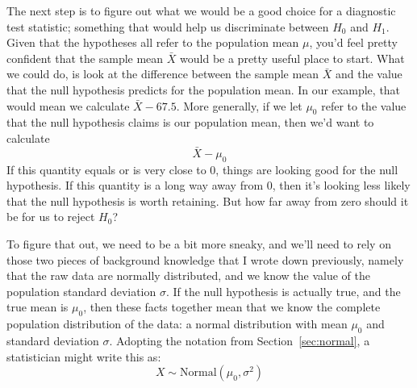 The next step is to figure out what we would be a good choice for a diagnostic test statistic; something that would help us discriminate between $H_0$ and $H_1$. Given that the hypotheses all refer to the population mean $\mu$, you'd feel pretty confident that the sample mean $\bar{X}$ would be a pretty useful place to start. What we could do, is look at the difference between the sample mean $\bar{X}$ and the value that the null hypothesis predicts for the population mean. In our example, that would mean we calculate $\bar{X} - 67.5$. More generally, if we let $\mu_0$ refer to the value that the null hypothesis claims is our population mean, then we'd want to calculate
$$
\bar{X} - \mu_0
$$
If this quantity equals or is very close to 0, things are looking good for the null hypothesis. If this quantity is a long way away from 0, then it's looking less likely that the null hypothesis is worth retaining. But how far away from zero should it be for us to reject $H_0$? 

To figure that out, we need to be a bit more sneaky, and we'll need to rely on those two pieces of background knowledge that I wrote down previously, namely that the raw data are normally distributed, and we know the value of the population standard deviation $\sigma$. If the null hypothesis is actually true, and the true mean is $\mu_0$, then these facts together mean that we know the complete population distribution of the data: a normal distribution with mean $\mu_0$ and standard deviation $\sigma$. Adopting the notation from Section~\ref{sec:normal}, a statistician might write this as:
$$
X \sim \mbox{Normal}(\mu_0,\sigma^2)
$$


